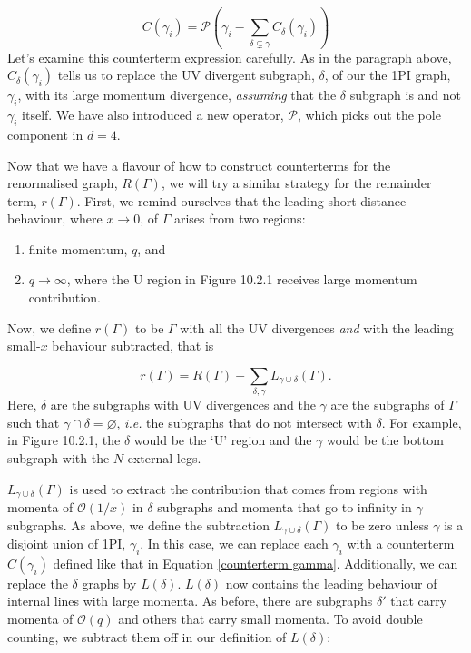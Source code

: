 \documentclass{article}
\begin{document}
\begin{equation}
    C(\gamma_i) = \mathcal{P}\left(\gamma_i - \sum_{\delta \varsubsetneq \gamma}C_\delta(\gamma_i)\right)
    \label{counterterm gamma}
\end{equation}
Let's examine this counterterm expression carefully. As in the paragraph above, $C_\delta(\gamma_i)$ tells us to replace the UV divergent subgraph, $\delta$, of our the 1PI graph, $\gamma_i$, with its large momentum divergence, \textit{assuming} that the $\delta$ subgraph is and not $\gamma_i$ itself. We have also introduced a new operator, $\mathcal{P}$, which picks out the pole component in $d=4$. 

Now that we have a flavour of how to construct counterterms for the renormalised graph, $R(\Gamma)$, we will try a similar strategy for the remainder term, $r(\Gamma)$. First, we remind ourselves that the leading short-distance behaviour, where $x\rightarrow 0$, of $\Gamma$ arises from two regions:

\begin{enumerate}
    \item finite momentum, $q$, and
    \item $q\rightarrow \infty$, where the U region in Figure 10.2.1 receives large momentum contribution.
\end{enumerate}

Now, we define $r(\Gamma)$ to be $\Gamma$ with all the UV divergences \textit{and} with the leading small-$x$ behaviour subtracted, that is

\begin{equation}
    r(\Gamma) = R(\Gamma) - \sum_{\delta,\gamma} L_{\gamma \cup \delta}(\Gamma).
\end{equation}
Here, $\delta$ are the subgraphs with UV divergences and the $\gamma$ are the subgraphs of $\Gamma$ such that $\gamma\cap\delta=\varnothing$, \textit{i.e.} the subgraphs that do not intersect with $\delta$. For example, in Figure 10.2.1, the $\delta$ would be the `U' region and the $\gamma$ would be the bottom subgraph with the $N$ external legs. 

$L_{\gamma\cup\delta}(\Gamma)$ is used to extract the contribution that comes from regions with momenta of $\mathcal{O}(1/x)$ in $\delta$ subgraphs and momenta that go to infinity in $\gamma$ subgraphs. As above, we define the subtraction $L_{\gamma\cup\delta}(\Gamma)$ to be zero unless $\gamma$ is a disjoint union of 1PI, $\gamma_i$. In this case, we can replace each $\gamma_i$ with a counterterm $C(\gamma_i)$ defined like that in Equation \ref{counterterm gamma}. Additionally, we can replace the $\delta$ graphs by $L(\delta)$. $L(\delta)$ now contains the leading behaviour of internal lines with large momenta. As before, there are subgraphs $\delta'$ that carry momenta of $\mathcal{O}(q)$ and others that carry small momenta. To avoid double counting, we subtract them off in our definition of $L(\delta)$:
\end{document}
